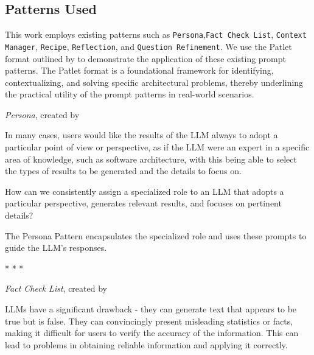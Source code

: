 \subsection{Patterns Used}


This work employs existing patterns such as \texttt{Persona},\texttt{Fact Check List}, \texttt{Context Manager}, \texttt{Recipe}, \texttt{Reflection}, and \texttt{Question Refinement}. We use the Patlet format  outlined by \textcite{buschmann2007pattern} to demonstrate the application of these existing prompt patterns. The Patlet format is a foundational framework for identifying, contextualizing, and solving specific architectural problems, thereby underlining the practical utility of the prompt patterns in real-world scenarios.


\textit{Persona}, created by \textcite{white2023prompt}

 In many cases, users would like the results of the LLM always to adopt a particular point of view or perspective, as if the LLM were an expert in a specific area of knowledge, such as software architecture, with this being able to select the types of results to be generated and the details to focus on.

 How can we consistently assign a specialized role to an LLM that adopts a particular perspective, generates relevant results, and focuses on pertinent details?

 The Persona Pattern encapsulates the specialized role and uses these prompts to guide the LLM's responses.

\begin{center}
*           *           * 
\end{center}

\textit{Fact Check List}, created by \textcite{white2023prompt}

 LLMs have a significant drawback - they can generate text that appears to be true but is false. They can convincingly present misleading statistics or facts, making it difficult for users to verify the accuracy of the information. This can lead to problems in obtaining reliable information and applying it correctly.

